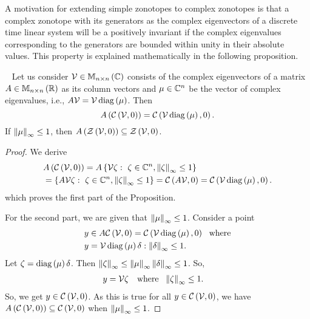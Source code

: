 %
A motivation for extending simple zonotopes to complex zonotopes is
that a complex zonotope with its generators as the complex
eigenvectors of a discrete time linear system will be a positively
invariant if the complex eigenvalues corresponding to the generators
are bounded within unity in their absolute values.  This property is
explained mathematically in the following proposition.
%
\begin{proposition}~\label{lem:eig-invariance}
Let us consider $\mathcal{V}\in\mathbb{M}_{n\times n}\left(\mathbb{C}\right)$ consists
of the complex eigenvectors of a matrix $A\in\mathbb{M}_{n\times n}\left(\mathbb{R}\right)$ as
its column vectors and $\mu\in\mathbb{C}^n$ be the vector of complex
eigenvalues, i.e., $A\mathcal{V}
= \mathcal{V}\operatorname{diag}\left(\mu\right)$.  Then \[A\left(\mathit{\mathcal{C}}\left(\mathcal{V},0\right)\right)
= \mathit{\mathcal{C}}\left(\mathcal{V}\operatorname{diag}\left(\mu\right),0\right).\] If
$\left\|\mu\right\|_{\infty}\leq 1$, then
$A\left(\mathit{\mathcal{Z}}\left(\mathcal{V},0\right)\right)\subseteq \mathit{\mathcal{Z}}\left(\mathcal{V},0\right)$.
\end{proposition}
% 
\begin{proof}
We derive
\begin{align*}
& A\left(\mathit{\mathcal{C}}\left(\mathcal{V},0\right)\right) =
A\left\{\mathcal{V}\zeta:~\zeta\in\mathbb{C}^n,\left\|\zeta\right\|_{\infty}\leq 1\right\}\\
& =\left\{A\mathcal{V}\zeta:~\zeta\in\mathbb{C}^n,\left\|\zeta\right\|_{\infty}\leq 1\right\}
= \mathit{\mathcal{C}}\left(A\mathcal{V},0\right)=\mathit{\mathcal{C}}\left(\mathcal{V}\operatorname{diag}\left(\mu\right),0\right).
\end{align*}
%
which proves the first part of the
Proposition.

For the second part, we are given that $\left\|\mu\right\|_{\infty}\leq 1$.
Consider a point
%
\begin{align*}
  & y\in A\mathit{\mathcal{C}}\left(\mathcal{V},0\right)=\mathit{\mathcal{C}}\left(\mathcal{V}\operatorname{diag}\left(\mu\right),0\right)~~\text{where}\\
  &y = \mathcal{V}\operatorname{diag}\left(\mu\right)\delta:\left\|\delta\right\|_{\infty}\leq
1.
\end{align*}
%
Let $\zeta = \operatorname{diag}\left(\mu\right)\delta$. Then $\left\|\zeta\right\|_{\infty} \leq
\left\|\mu\right\|_{\infty}\left\|\delta\right\|_{\infty} \leq 1$.  So,
%
\begin{align*}
  & y=\mathcal{V}\zeta~~\text{ where }~
  \left\|\zeta\right\|_{\infty}\leq 1.
\end{align*}
%
So, we get $y\in \mathit{\mathcal{C}}\left(\mathcal{V},0\right)$.  As this is true for all
$y\in\mathit{\mathcal{C}}\left(\mathcal{V},0\right)$, we have
$A\left(\mathit{\mathcal{C}}\left(\mathcal{V},0\right)\right)\subseteq
\mathit{\mathcal{C}}\left(\mathcal{V},0\right)$ when $\left\|\mu\right\|_{\infty}\leq 1$.
\end{proof}
%



